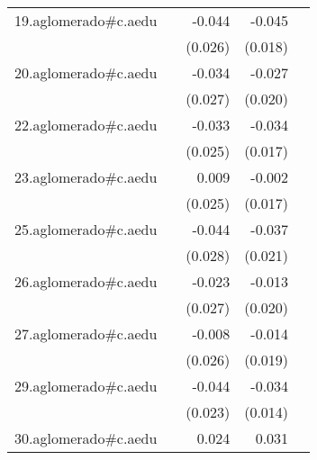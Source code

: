 {\begin{longtable}{l*{4}{D{.}{.}{-1}}}
\addlinespace
19.aglomerado#c.aedu&                     &      -0.044         &      -0.045\sym{*}  &                     \\
            &                     &     (0.026)         &     (0.018)         &                     \\
\addlinespace
20.aglomerado#c.aedu&                     &      -0.034         &      -0.027         &                     \\
            &                     &     (0.027)         &     (0.020)         &                     \\
\addlinespace
22.aglomerado#c.aedu&                     &      -0.033         &      -0.034\sym{*}  &                     \\
            &                     &     (0.025)         &     (0.017)         &                     \\
\addlinespace
23.aglomerado#c.aedu&                     &       0.009         &      -0.002         &                     \\
            &                     &     (0.025)         &     (0.017)         &                     \\
\addlinespace
25.aglomerado#c.aedu&                     &      -0.044         &      -0.037         &                     \\
            &                     &     (0.028)         &     (0.021)         &                     \\
\addlinespace
26.aglomerado#c.aedu&                     &      -0.023         &      -0.013         &                     \\
            &                     &     (0.027)         &     (0.020)         &                     \\
\addlinespace
27.aglomerado#c.aedu&                     &      -0.008         &      -0.014         &                     \\
            &                     &     (0.026)         &     (0.019)         &                     \\
\addlinespace
29.aglomerado#c.aedu&                     &      -0.044\sym{*}  &      -0.034\sym{*}  &                     \\
            &                     &     (0.023)         &     (0.014)         &                     \\
\addlinespace
30.aglomerado#c.aedu&                     &       0.024         &       0.031         &                     \\

\end{longtable}}

